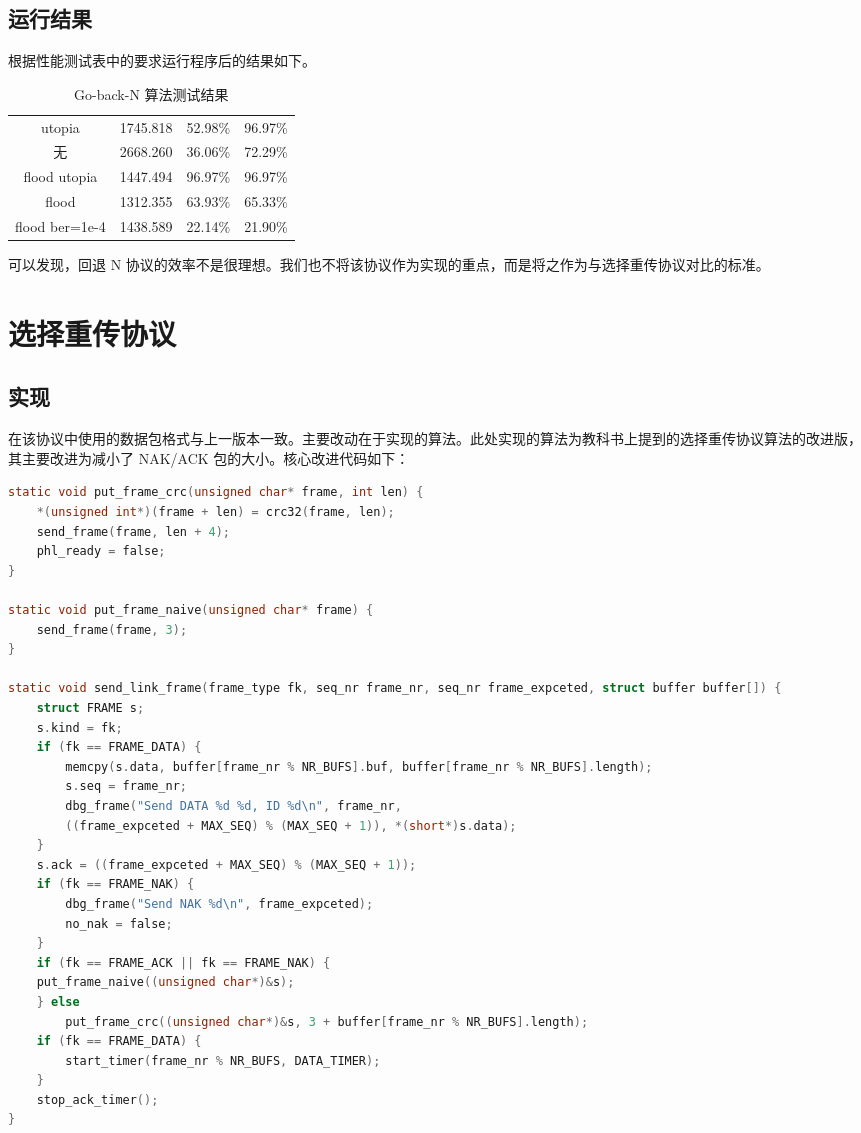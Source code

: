 \documentclass[14pt]{article} %
\begin{document}
\subsection{运行结果}
根据性能测试表中的要求运行程序后的结果如下。

\begin{table}[!htbp]
	\caption{Go-back-N 算法测试结果}\label{gbn} \centering
	\begin{tabular}{cccc}
		\toprule[1.5pt]
		\makebox[0.3\textwidth][c]{参数}	&  \makebox[0.1\textwidth][c]{运行时间} &
		\makebox[0.2\textwidth][c]{线路利用率(A)} & \makebox[0.2\textwidth][c]{线路利用率(B)} \\ \midrule[1pt]
		\textendash utopia & 1745.818 & 52.98\% & 96.97\% \\
		无 & 2668.260 & 36.06\% & 72.29\% \\
		\textendash flood \textendash utopia & 1447.494 & 96.97\% & 96.97\% \\
		\textendash flood & 1312.355 & 63.93\% & 65.33\% \\
		\textendash flood  \textendash ber=1e-4 & 1438.589 & 22.14\% & 21.90\% \\
		\bottomrule[1.5pt]
	\end{tabular}
\end{table}

可以发现，回退 N 协议的效率不是很理想。我们也不将该协议作为实现的重点，而是将之作为与选择重传协议对比的标准。

\section{选择重传协议}
\subsection{实现}
在该协议中使用的数据包格式与上一版本一致。主要改动在于实现的算法。此处实现的算法为教科书上提到的选择重传协议算法的改进版，其主要改进为减小了 NAK/ACK 包的大小。核心改进代码如下：
\begin{lstlisting}[language=C]
static void put_frame_crc(unsigned char* frame, int len) {
	*(unsigned int*)(frame + len) = crc32(frame, len);
	send_frame(frame, len + 4);
	phl_ready = false;
}

static void put_frame_naive(unsigned char* frame) {
	send_frame(frame, 3);
}

static void send_link_frame(frame_type fk, seq_nr frame_nr, seq_nr frame_expceted, struct buffer buffer[]) {
	struct FRAME s;
	s.kind = fk;
	if (fk == FRAME_DATA) {
		memcpy(s.data, buffer[frame_nr % NR_BUFS].buf, buffer[frame_nr % NR_BUFS].length);
		s.seq = frame_nr;
		dbg_frame("Send DATA %d %d, ID %d\n", frame_nr,
		((frame_expceted + MAX_SEQ) % (MAX_SEQ + 1)), *(short*)s.data);
	}
	s.ack = ((frame_expceted + MAX_SEQ) % (MAX_SEQ + 1));
	if (fk == FRAME_NAK) {
		dbg_frame("Send NAK %d\n", frame_expceted);
		no_nak = false;
	}
	if (fk == FRAME_ACK || fk == FRAME_NAK) {
	put_frame_naive((unsigned char*)&s);
	} else
		put_frame_crc((unsigned char*)&s, 3 + buffer[frame_nr % NR_BUFS].length);
	if (fk == FRAME_DATA) {
		start_timer(frame_nr % NR_BUFS, DATA_TIMER);
	}
	stop_ack_timer();
}
\end{lstlisting}
\end{document}
